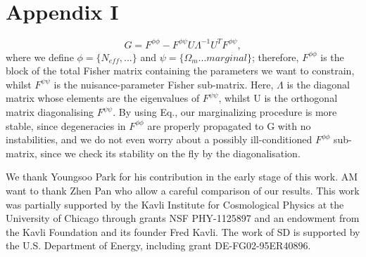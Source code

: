\documentclass[aps,prl,preprint,groupedaddress]{revtex4-1}
\begin{document}
\appendix
\section{Appendix I}
\begin{equation}
G = F^{\phi\phi} - F^{\phi\psi}U\Lambda^{-1}U^{T}F^{\phi\psi},
\end{equation}
where we define $\phi = \{N_{eff},...\}$ and $\psi = \{\Omega_{m} ... marginal\}$; therefore, $F^{\phi\phi}$ is the block of the total Fisher matrix containing the parameters we want to constrain, whilst $F^{\psi\psi}$ is the nuisance-parameter Fisher sub-matrix. Here, $\Lambda$ is the diagonal matrix whose elements are the eigenvalues of $F^{\psi\psi}$, whilst U is the orthogonal matrix diagonalising $F^{\psi\psi}$. By using Eq., our marginalizing procedure is more stable, since degeneracies in $F^{\phi\phi}$ are properly propagated to G with no instabilities, and we do not even worry about a possibly ill-conditioned $F^{\phi\phi}$ sub-matrix, since we check its stability on the fly by the diagonalisation.


\begin{acknowledgments}
We thank Youngsoo Park for his contribution in the early stage of this work.
AM want to thank Zhen Pan who allow a careful comparison of our results.
This work was partially supported by the Kavli Institute for Cosmological Physics at the University of Chicago through grants NSF PHY-1125897 and an endowment from the Kavli Foundation and its founder Fred Kavli.
The work of SD is supported by the U.S. Department of Energy, including grant DE-FG02-95ER40896.
\end{acknowledgments}


\end{document}
